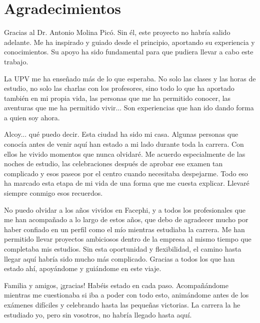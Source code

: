 \chapter*{Agradecimientos}

Gracias al Dr. Antonio Molina Picó. Sin él, este proyecto no habría salido adelante. Me ha inspirado y guiado desde el principio, aportando su experiencia y conocimientos. Su apoyo ha sido fundamental para que pudiera llevar a cabo este trabajo.

La UPV me ha enseñado más de lo que esperaba. No solo las clases y las horas de estudio, no solo las charlas con los profesores, sino todo lo que ha aportado también en mi propia vida, las personas que me ha permitido conocer, las aventuras que me ha permitido vivir... Son experiencias que han ido dando forma a quien soy ahora.

Alcoy... qué puedo decir. Esta ciudad ha sido mi casa. Algunas personas que conocía antes de venir aquí han estado a mi lado durante toda la carrera. Con ellos he vivido momentos que nunca olvidaré. Me acuerdo especialmente de las noches de estudio, las celebraciones después de aprobar ese examen tan complicado y esos paseos por el centro cuando necesitaba despejarme. Todo eso ha marcado esta etapa de mi vida de una forma que me cuesta explicar. Llevaré siempre conmigo esos recuerdos.

No puedo olvidar a los años vividos en Facephi, y a todos los profesionales que me han acompañado a lo largo de estos años, que debo de agradecer mucho por haber confiado en un perfil como el mío mientras estudiaba la carrera. Me han permitido llevar proyectos ambiciosos dentro de la empresa al mismo tiempo que completaba mis estudios. Sin esta oportunidad y flexibilidad, el camino hasta llegar aquí habría sido mucho más complicado. Gracias a todos los que han estado ahí, apoyándome y guiándome en este viaje.

Familia y amigos, ¡gracias! Habéis estado en cada paso. Acompañándome mientras me cuestionaba si iba a poder con todo esto, animándome antes de los exámenes difíciles y celebrando hasta las pequeñas victorias. La carrera la he estudiado yo, pero sin vosotros, no habría llegado hasta aquí.